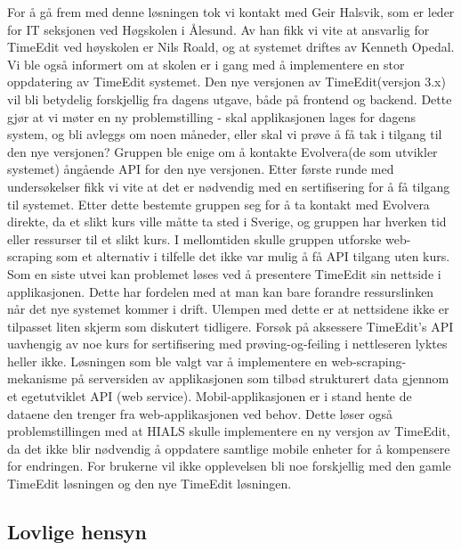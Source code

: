 \documentclass[../main.tex]{subfiles}
\begin{document}
For å gå frem med denne løsningen tok vi kontakt med Geir Halsvik, som er leder for IT seksjonen ved Høgskolen i Ålesund. Av han fikk vi vite at ansvarlig for TimeEdit ved høyskolen er Nils Roald, og at systemet driftes av Kenneth Opedal. Vi ble også informert om at skolen er i gang med å implementere en stor oppdatering av TimeEdit systemet. Den nye versjonen av TimeEdit(versjon 3.x) vil bli betydelig forskjellig fra dagens utgave, både på frontend og backend.\newline
\newline
Dette gjør at vi møter en ny problemstilling - skal applikasjonen lages for dagens system, og bli avleggs om noen måneder, eller skal vi prøve å få tak i tilgang til den nye versjonen? Gruppen ble enige om å kontakte Evolvera(de som utvikler systemet) ångående API for den nye versjonen. Etter første runde med undersøkelser fikk vi vite at det er nødvendig med en sertifisering for å få tilgang til systemet. Etter dette bestemte gruppen seg for å ta kontakt med Evolvera direkte, da et slikt kurs ville måtte ta sted i Sverige, og gruppen har hverken tid eller ressurser til et slikt kurs. I mellomtiden skulle gruppen utforske web-scraping som et alternativ i tilfelle det ikke var mulig å få API tilgang uten kurs. Som en siste utvei kan problemet løses ved å presentere TimeEdit sin nettside i applikasjonen. Dette har fordelen med at man kan bare forandre ressurslinken når det nye systemet kommer i drift. Ulempen med dette er at nettsidene ikke er tilpasset liten skjerm som diskutert tidligere.\newline
Forsøk på aksessere TimeEdit’s API uavhengig av noe kurs for sertifisering med prøving-og-feiling i nettleseren lyktes heller ikke.\newline
\newline
Løsningen som ble valgt var å implementere en web-scraping-mekanisme på serversiden av applikasjonen som tilbød strukturert data gjennom et egetutviklet API (web service). Mobil-applikasjonen er i stand hente de dataene den trenger fra web-applikasjonen ved behov. Dette løser også problemstillingen med at HIALS skulle implementere en ny versjon av TimeEdit, da det ikke blir nødvendig å oppdatere samtlige mobile enheter for å kompensere for endringen. For brukerne vil ikke opplevelsen bli noe forskjellig med den gamle TimeEdit løsningen og den nye TimeEdit løsningen.

\subsection{Lovlige hensyn}
\end{document}
